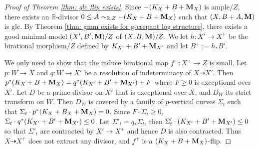 \documentclass[11pt]{amsart}
\numberwithin{equation}{section}
\newcommand{\Mm}{{\bf{M}}}
\theoremstyle{definition}
\theoremstyle{definition}
\theoremstyle{definition}
\begin{document}
\begin{proof}[Proof of Theorem \ref{thm: glc flip exists}]
Since $-(K_X+B+\Mm_X)$ is ample$/Z$, there exists an $\mathbb R$-divisor $0\leq A\sim_{\mathbb R,Z}-(K_X+B+\Mm_X)$ such that $(X,B+A,\Mm)$ is glc. By Theorem \ref{thm: gmm exists for g-crepant log structure}, there exists a good minimal model $(X',B',\Mm)/Z$ of $(X,B,\Mm)/Z$. We let $h: X'\rightarrow X^+$ be the birational morphism$/Z$ defined by $K_{X'}+B'+\Mm_{X'}$ and let $B^+:=h_*B'$.

We only need to show that the induce birational map $f^+: X^+\rightarrow Z$ is small. Let $p:W\to X$ and $q:W\to X'$ be a resolution of indeterminacy of $X\dashrightarrow X'$. Then $p^*(K_X+B+\Mm_X)=q^*(K_{X'}+B'+\Mm_{X'})+F$ where $F\geq 0$ is exceptional over $X'$. Let $D$ be a prime divisor on $X'$ that is exceptional over $X$, and $D_W$ its strict transform on $W$. Then $D_W$ is covered by a family of $p$-vertical curves $\Sigma _t$ such that $\Sigma_t\cdot p^*(K_X+B_X+\Mm_X)=0$. Since $F\cdot\Sigma_t\geq 0$, $\Sigma_t\cdot q^*(K_{X'}+B'+\Mm_{X'})\leq 0$. 
Let $\Sigma'_t=q_*\Sigma _t$, then $\Sigma ' _t\cdot (K_{X'}+B'+\Mm_{X'})\leq 0$ so that $\Sigma '_t$ are contracted by $X'\to X^+$ and hence $D$ is also contracted. Thus $X\dashrightarrow X^+$ does not extract any divisor, and $f^+$ is a $(K_X+B+\Mm_X)$-flip.
\end{proof}
\end{document}
